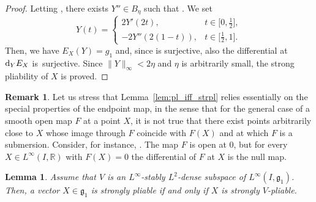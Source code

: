 \documentclass[10pt,a4paper]{amsart}
\numberwithin{equation}{section}
\newtheorem{Lemma}[Theorem]{Lemma}
\theoremstyle{definition}
\newtheorem{Remark}[Theorem]{Remark}
\begin{document}
\begin{proof}
Letting , there exists $Y''\in B_\eta$ such that . We set
 \begin{equation*}
 Y(t)=
 \begin{cases}
 2Y'(2t), & t\in\bigl[0,\frac12\bigr],\\
 -2Y''(2(1-t)), & t\in\bigl[\frac12,1\bigr].
 \end{cases}
 \end{equation*}
 Then, we have $E_X(Y)=g_1$ and, since  is surjective, also the differential at~${\rm d}_YE_{X}$ is~surjective.
 Since $\|Y\|_\infty<2\eta$ and $\eta$ is arbitrarily small, the strong pliability of $X$ is proved.
\end{proof}

\begin{Remark}Let us stress that
Lemma~\ref{lem:pl_iff_strpl}
relies essentially on the special
properties of the endpoint map, in the sense that for the general case of a smooth open map $F$ at a point $X$, it is not true that there exist points arbitrarily close to $X$ whose image through $F$ coincide with $F(X)$ and at which $F$ is a submersion. Consider, for instance, . The map $F$ is open at $0$, but for every $X\in L^\infty(I,\mathbb{R})$ with $F(X)=0$ the differential of $F$ at $X$ is the null map.
\end{Remark}

\begin{Lemma} \label{lem:pl_iff_strpl2}
 Assume that
 $V$ is an
 $L^\infty$-stably $L^2$-dense subspace of
 $L^\infty(I,{\mathfrak g}_1)$.
 Then, a vector $X\in{\mathfrak g}_1$ is strongly
 pliable if and only if
 $X$ is strongly $V$-pliable.
\end{Lemma}
\end{document}
